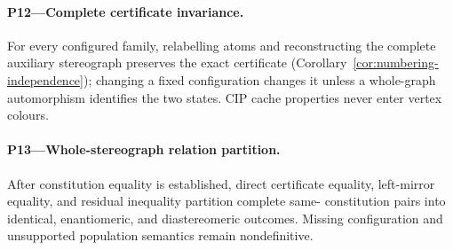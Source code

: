 \documentclass[pdflatex,sn-mathphys-num,referee,lineno]{sn-jnl}
\theoremstyle{plain}
\theoremstyle{remark}
\theoremstyle{definition}
\begin{document}
\paragraph{P12---Complete certificate invariance.}
For every configured family, relabelling atoms and reconstructing the complete
auxiliary stereograph preserves the exact certificate
(Corollary~\ref{cor:numbering-independence}); changing a fixed
configuration changes it unless a whole-graph automorphism identifies the two
states.  CIP cache properties never enter vertex colours.

\paragraph{P13---Whole-stereograph relation partition.}
After constitution equality is established, direct certificate equality,
left-mirror equality, and residual inequality partition complete same-
constitution pairs into identical, enantiomeric, and diastereomeric outcomes.
Missing configuration and unsupported population semantics remain
nondefinitive.
\end{document}
